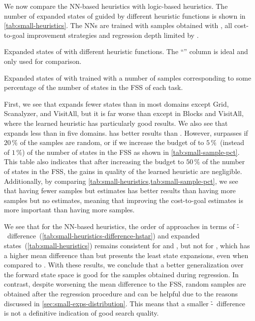 We now compare the NN-based heuristics with logic-based heuristics. The number of expanded states of \gbfs guided by different heuristic functions is shown in \cref{tab:small-heuristics}. The NNs are trained with samples obtained with \bfsrw, all cost-to-goal improvement strategies and regression depth limited by \rlmeanfx.  

\begin{table}[tb]
    \caption[Expanded states of different heuristic functions.]{Expanded states of \gbfs with different heuristic functions. The ``\hstar'' column is ideal and only used for comparison.}
    \addmargin
    \label{tab:small-heuristics}
    \centering
    
\end{table}

\begin{table}[tb]
    \caption[Expanded states from different sample set sizes.]{Expanded states of \gbfs with \hnnl{\rlmeanfx} trained with a number of samples corresponding to some percentage of the number of states in the FSS of each task.}
    \label{tab:small-sample-pct}
    \addmargin
    \centering
    
\end{table}

First, we see that \hnnbase expands fewer states than \hgc in most domains except Grid, Scanalyzer, and VisitAll, but it is far worse than \hff except in Blocks and VisitAll, where the learned heuristic has particularly good results. We also see that \hnnl{\rlmeanfx} expands less than \hnnbase in five domains. \hff has better results than \hnnl{\rlmeanfx}. However, \hnnl{\rlmeanfx} surpasses \hff if $20\,\%$ of the samples are random, or if we increase the budget of \hnnl{\rlmeanfx} to $5\,\%$~(instead of $1\,\%$) of the number of states in the FSS as shown in \cref{tab:small-sample-pct}. This table also indicates that after increasing the budget to $50\,\%$ of the number of states in the FSS, the gains in quality of the learned heuristic are negligible. Additionally, by comparing \cref{tab:small-heuristics,tab:small-sample-pct}, we see that having fewer samples but \hstar estimates has better results than having more samples but no \hstar estimates, meaning that improving the cost-to-goal estimates is more important than having more samples.

We see that for the NN-based heuristics, the order of approaches in terms of \mbox{\h-\hstar}~difference~(\cref{tab:small-heuristics-difference-hstar}) and expanded states~(\cref{tab:small-heuristics}) remains consistent for \hnnbase and \hnnl{\rlmeanfx}, but not for \hnnrs, which has a higher mean difference than \hnnl{\rlmeanfx} but presents the least state expansions, even when compared to \hff. With these results, we conclude that a better generalization over the forward state space is good for the samples obtained during regression. In contrast, despite worsening the mean difference to the FSS, random samples are obtained after the regression procedure and can be helpful due to the reasons discussed in \cref{sec:small-exps-distribution}. This means that a smaller \mbox{\h-\hstar}~difference is not a definitive indication of good search quality.

